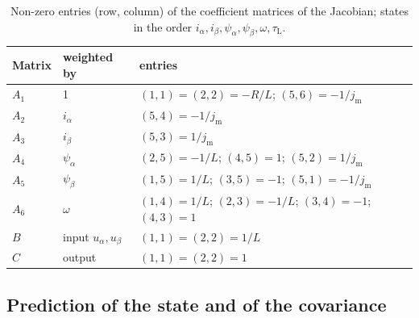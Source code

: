 \documentclass[11pt,a4paper]{scrartcl}
\newcommand{\ped}[1]{_{\mathrm{#1}}}
\begin{document}
\begin{onehalfspace}
\begin{table}[H]
	\centering
	\footnotesize
	\caption{Non-zero entries (row, column) of the coefficient matrices of the Jacobian; states in the order $i_\alpha, i_\beta, \psi_\alpha, \psi_\beta, \omega, \tau\ped{L}$.}
	\label{tab:jacobian}
	\begin{tabular}{@{} l l l @{}}
		\toprule
		\textbf{Matrix} & \textbf{weighted by} & \textbf{entries} \\
		\midrule
		$A_1$ & 1 & $(1,1) = (2,2) = -R/L$; $(5,6) = -1/j\ped{m}$ \\
		$A_2$ & $i_\alpha$ & $(5,4) = -1/j\ped{m}$ \\
		$A_3$ & $i_\beta$ & $(5,3) = 1/j\ped{m}$ \\
		$A_4$ & $\psi_\alpha$ & $(2,5) = -1/L$; $(4,5) = 1$; $(5,2) = 1/j\ped{m}$ \\
		$A_5$ & $\psi_\beta$ & $(1,5) = 1/L$; $(3,5) = -1$; $(5,1) = -1/j\ped{m}$ \\
		$A_6$ & $\omega$ & $(1,4) = 1/L$; $(2,3) = -1/L$; $(3,4) = -1$; $(4,3) = 1$ \\
		$B$ & input $u_\alpha, u_\beta$ & $(1,1) = (2,2) = 1/L$ \\
		$C$ & output & $(1,1) = (2,2) = 1$ \\
		\bottomrule
	\end{tabular}
\end{table}

\subsection{Prediction of the state and of the covariance}
\label{sec:ekfpred}


\end{onehalfspace}
\end{document}
